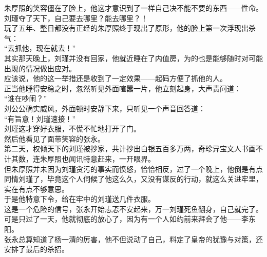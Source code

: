 \begin{multicols}{\theparacolNo}
朱厚照的笑容僵在了脸上，他这才意识到了一样自己决不能不要的东西——性命。\\

刘瑾夺了天下，自己要去哪里？能去哪里？！\\

玩了五年、整日都没有正经的朱厚照终于现出了原形，他的脸上第一次浮现出杀气：\\

“去抓他，现在就去！”\\

其实那天晚上，刘瑾并没有回家，他就近睡在了内值房，为的也是能够随时对可能出现的情况做出应对。\\

应该说，他的这一举措还是收到了一定效果——起码方便了抓他的人。\\

正当他睡得安稳之时，忽然听见外面喧嚣一片，他立刻起身，大声责问道：\\

“谁在吵闹？”\\

刘公公确实威风，外面顿时安静下来，只听见一个声音回答道：\\

“有旨意！刘瑾速接！”\\

刘瑾这才穿好衣服，不慌不忙地打开了门。\\

然后他看见了面带笑容的张永。\\

第二天，权倾天下的刘瑾被抄家，共计抄出白银五百多万两，奇珍异宝文人书画不计其数，连朱厚照也闻讯特意赶来，一开眼界。\\

但朱厚照并未因为刘瑾贪污的事实而愤怒，恰恰相反，过了一个晚上，他倒是有点同情刘瑾了，毕竟这个人伺候了他这么久，又没有谋反的行动，就这么关进牢里，实在有点不够意思。\\

于是他特意下令，给在牢中的刘瑾送几件衣服。\\

这是一个危险的信号，张永开始忐忑不安起来，万一刘瑾死鱼翻身，自己就完了。\\

可是只过了一天，他就彻底的放心了，因为有一个人如约前来拜会了他——李东阳。\\

张永总算知道了杨一清的厉害，他不但说动了自己，料定了皇帝的犹豫与对策，还安排了最后的杀招。\\


\end{multicols}
